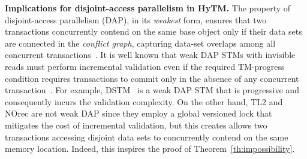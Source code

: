\vspace{1mm}\noindent\textbf{Implications for disjoint-access parallelism in HyTM.}
The property of disjoint-access parallelism (DAP), in its \emph{weakest} form, ensures that two transactions %
concurrently contend on the same base object 
only if their data 
sets are connected in the \emph{conflict graph}, capturing 
data-set overlaps among all concurrent transactions~\cite{AHM09}. It is well known that weak DAP STMs with invisible reads must perform incremental validation even if the required TM-progress condition requires
transactions to commit only in the absence of any concurrent transaction~\cite{tm-book,prog15-pact}. For example, DSTM~\cite{HLM+03} is a weak DAP STM that is progressive and consequently incurs the validation
complexity. On the other hand, TL2 and NOrec are not weak DAP since they employ a global versioned lock that mitigates the cost of incremental validation, but this creates allows two transactions accessing
disjoint data sets to concurrently contend on the same memory location. Indeed, this inspires the proof of Theorem~\ref{th:impossibility}. 
